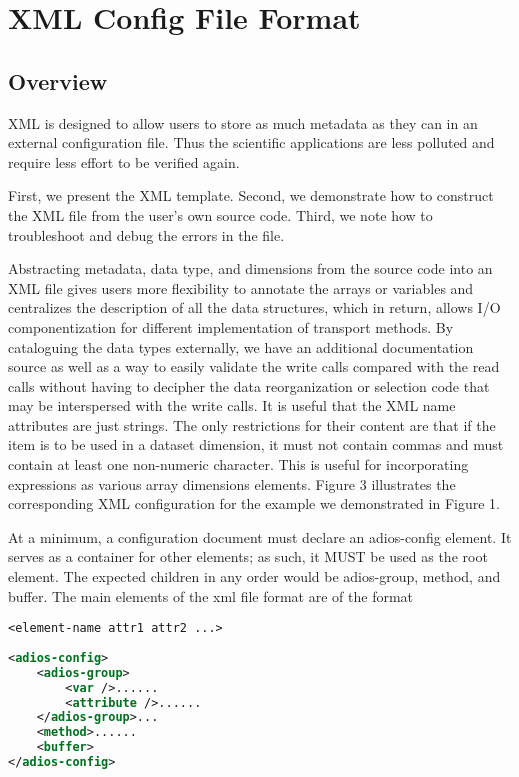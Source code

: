 \chapter{XML Config File Format}

\section{Overview} 
XML is designed to allow users to store as much metadata as they can in an external 
configuration file. Thus the scientific applications are less polluted and require 
less effort to be verified again.

First, we present the XML template. Second, we demonstrate how to construct the 
XML file from the user's own source code. Third, we note how to troubleshoot and 
debug the errors in the file.  

Abstracting metadata, data type, and dimensions from the source code into an XML 
file gives users more flexibility to annotate the arrays or variables and centralizes 
the description of all the data structures, which in return, allows I/O componentization 
for different implementation of transport methods. By cataloguing the data types 
externally, we have an additional documentation source as well as a way to easily 
validate the write calls compared with the read calls without having to decipher 
the data reorganization or selection code that may be interspersed with the write 
calls. It is useful that the XML name attributes are just strings. The only restrictions 
for their content are that if the item is to be used in a dataset dimension, it 
must not contain commas and must contain at least one non-numeric character. This 
is useful for incorporating expressions as various array dimensions elements. Figure 
3 illustrates the corresponding XML configuration for the example we demonstrated 
in Figure 1. 

At a minimum, a configuration document must declare an adios-config element. It 
serves as a container for other elements; as such, it MUST be used as the root 
element. The expected children in any order would be adios-group, method, and buffer. 
The main elements of the xml file format are of the format 

\begin{lstlisting}
<element-name attr1 attr2 ...>
\end{lstlisting}

\begin{lstlisting}[language=XML, caption=Example XML configuration]
<adios-config> 
	<adios-group>
		<var />......
		<attribute />...... 
	</adios-group>... 
	<method>...... 
	<buffer>
</adios-config>
\end{lstlisting}


